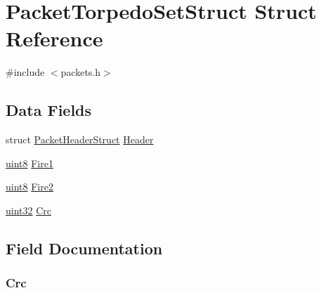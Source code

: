 \hypertarget{struct_packet_torpedo_set_struct}{}\section{Packet\+Torpedo\+Set\+Struct Struct Reference}
\label{struct_packet_torpedo_set_struct}


{\ttfamily \#include $<$packets.\+h$>$}

\subsection*{Data Fields}
\begin{DoxyCompactItemize}
\item 
struct \hyperlink{struct_packet_header_struct}{Packet\+Header\+Struct} \hyperlink{struct_packet_torpedo_set_struct_ab201af50281aff5ed4f984f994938007}{Header}
\item 
\hyperlink{_h_y_d_r_a_s_8_x_2types_8h_a33a5e996e7a90acefb8b1c0bea47e365}{uint8} \hyperlink{struct_packet_torpedo_set_struct_a1b9060a8e227edc15703bd04103db303}{Fire1}
\item 
\hyperlink{_h_y_d_r_a_s_8_x_2types_8h_a33a5e996e7a90acefb8b1c0bea47e365}{uint8} \hyperlink{struct_packet_torpedo_set_struct_ac7f6ba4d7f60290dbc0270a43783c858}{Fire2}
\item 
\hyperlink{_h_y_d_r_a_s_8_x_2types_8h_acbd4acd0d29e2d6c43104827f77d9cd2}{uint32} \hyperlink{struct_packet_torpedo_set_struct_a1aaa4998291cff4c19ca5cca4b1e9489}{Crc}
\end{DoxyCompactItemize}


\subsection{Field Documentation}
\hypertarget{struct_packet_torpedo_set_struct_a1aaa4998291cff4c19ca5cca4b1e9489}{}
\subsubsection[{Crc}]{ Crc}\label{struct_packet_torpedo_set_struct_a1aaa4998291cff4c19ca5cca4b1e9489}
\hypertarget{struct_packet_torpedo_set_struct_a1b9060a8e227edc15703bd04103db303}{}
